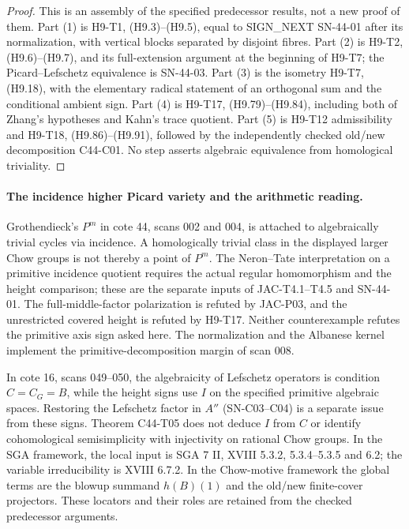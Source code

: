 \documentclass[11pt]{article}
\theoremstyle{remark}\newtheorem{remark}[theorem]{Remark}
\begin{document}
\begin{proof}
This is an assembly of the specified predecessor results, not a new
proof of them. Part (1) is H9-T1, (H9.3)--(H9.5), equal to
SIGN\_NEXT SN-44-01 after its normalization, with vertical blocks
separated by disjoint fibres. Part (2) is H9-T2, (H9.6)--(H9.7),
and its full-extension argument at the beginning of H9-T7;
the Picard--Lefschetz equivalence is SN-44-03. Part (3) is the
isometry H9-T7, (H9.18), with the elementary radical statement
of an orthogonal sum and the conditional ambient sign. Part (4)
is H9-T17, (H9.79)--(H9.84), including both of Zhang's hypotheses
and Kahn's trace quotient. Part (5) is H9-T12 admissibility and
H9-T18, (H9.86)--(H9.91), followed by the independently checked
old/new decomposition C44-C01. No step asserts algebraic
equivalence from homological triviality.
\end{proof}

\paragraph{The incidence higher Picard variety and the arithmetic reading.}
Grothendieck's $P^m$ in cote 44, scans 002 and 004, is attached
to algebraically trivial cycles via incidence. A homologically
trivial class in the displayed larger Chow groups is not thereby
a point of $P^m$. The Neron--Tate interpretation on a primitive
incidence quotient requires the actual regular homomorphism and
the height comparison; these are the separate inputs of
JAC-T4.1--T4.5 and SN-44-01. The full-middle-factor polarization
is refuted by JAC-P03, and the unrestricted covered height is
refuted by H9-T17. Neither counterexample refutes the primitive
axis sign asked here. The normalization and the Albanese kernel
implement the primitive-decomposition margin of scan 008.

In cote 16, scans 049--050, the algebraicity of Lefschetz operators
is condition $C=C_G=B$, while the height signs use $I$ on the
specified primitive algebraic spaces. Restoring the Lefschetz
factor in $A''$ (SN-C03--C04) is a separate issue from these
signs. Theorem C44-T05 does not deduce $I$ from $C$ or identify
cohomological semisimplicity with injectivity on rational Chow
groups. In the SGA framework, the local input is SGA 7 II,
XVIII 5.3.2, 5.3.4--5.3.5 and 6.2; the variable irreducibility
is XVIII 6.7.2. In the Chow-motive framework the global terms
are the blowup summand $h(B)(1)$ and the old/new finite-cover
projectors. These locators and their roles are retained from
the checked predecessor arguments.
\end{document}
